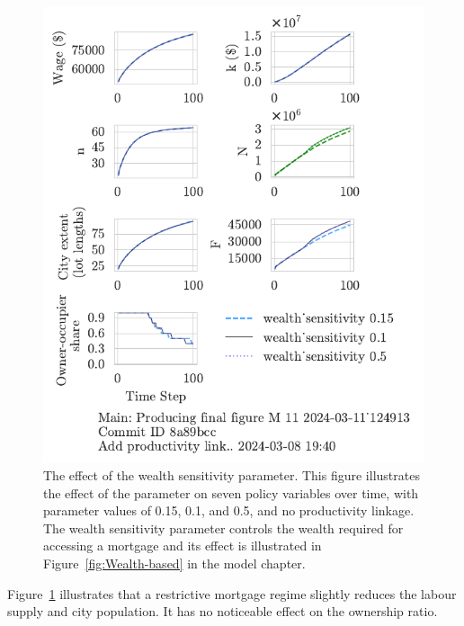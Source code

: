 \begin{figure}[h!bt]
\centering
\includegraphics[scale=0.9, trim={0 1.4cm 0 0},clip]{fig/wealth_sensitivity-124913.pdf}
\caption[The effect of the wealth sensitivity parameter]{The effect of the wealth sensitivity parameter. This figure illustrates the effect of the parameter on seven policy variables over time, with parameter values of 0.15, 0.1, and 0.5, and no productivity linkage. The wealth sensitivity parameter controls the wealth required for accessing a mortgage and its effect is illustrated in Figure~\ref{fig:Wealth-based} in the model chapter.}  
\label{fig:wealth_sensitivity_ownership_trajectory}
\end{figure}

Figure~\ref{fig:wealth_sensitivity_ownership_trajectory} illustrates that a restrictive mortgage regime slightly reduces the labour supply and city population. It has no noticeable effect on the ownership ratio. %

